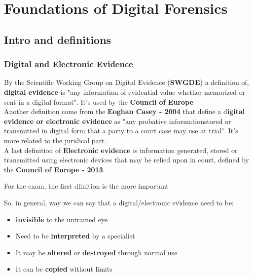 \chapter{Foundations of Digital Forensics}

\section{Intro and definitions}

\subsection{Digital and Electronic Evidence}

By the Scientific Working Group on Digital Evidence (\textbf{SWGDE}) a definition of,  \textbf{digital evidence} is "any information of evidential value  whether memorized or sent in a digital format". It's used by the \textbf{Council of Europe} \\ Another definition come from the \textbf{ Eoghan Casey - 2004} that define  a d\textbf{igital evidence or electronic evidence} as "any probative informationstored  or transmitted in digital form that a party to a court case may use at trial". It's more related to the  juridical part. \\ A last definition of \textbf{Electronic evidence} is information generated, stored or transmitted using electronic devices that may be relied upon in court, defined by the \textbf{Council of Europe - 2013}.

\begin{boxH}
  For the exam, the first dfinition is the more important
\end{boxH}

So. in general, way we can say that a digital/electronic evidence need to be:
\begin{itemize}
  \item \textbf{invisible} to the untrained eye
  \item Need to be \textbf{interpreted} by a specialist
  \item It may be \textbf{altered} or \textbf{destroyed} through normal use
  \item It can be \textbf{copied} without limits
\end{itemize}

